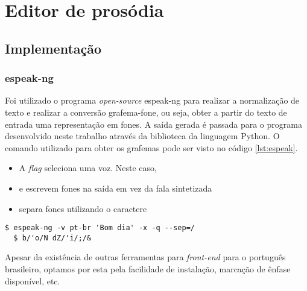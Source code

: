 
\simb[ms (milissegundos)]
\simb[Hz (Hertz)]

\chapter{Editor de prosódia}

\section{Implementação}

\subsection{espeak-ng}
Foi utilizado o programa \emph{open-source} espeak-ng \cite{espeakng} para
realizar a normalização de texto e realizar a conversão grafema-fone, ou seja,
obter a partir do texto de entrada uma representação em fones. A saída gerada
é passada para o programa desenvolvido neste trabalho através da biblioteca
 da linguagem Python. O comando utilizado para obter os grafemas pode ser visto no código \ref{lst:espeak}.

\begin{itemize}
\item A \emph{flag}  seleciona uma voz. Neste caso, 
\item {} e  escrevem fones na saída em vez da fala sintetizada
\item {} separa fones utilizando o caractere \code{/}
\end{itemize}

\begin{lstlisting}[caption=Utilização do programa espeak e saída correspondente,
  label=lst:espeak]
  $ espeak-ng -v pt-br 'Bom dia' -x -q --sep=/
  $ b/'o/N dZ/'i/;/&
\end{lstlisting}

Apesar da existência de outras ferramentas para \emph{front-end} para o português brasileiro, optamos por esta pela facilidade de instalação, marcação de ênfase disponível, etc.

